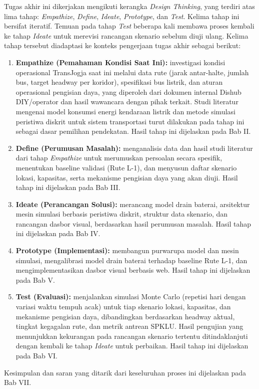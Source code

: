 Tugas akhir ini dikerjakan mengikuti kerangka \textit{Design Thinking}, yang
terdiri atas lima tahap: \textit{Empathize}, \textit{Define}, \textit{Ideate},
\textit{Prototype}, dan \textit{Test}. Kelima tahap ini bersifat iteratif.
Temuan pada tahap \textit{Test} beberapa kali membawa proses kembali ke tahap
\textit{Ideate} untuk merevisi rancangan skenario sebelum diuji ulang. Kelima
tahap tersebut diadaptasi ke konteks pengerjaan tugas akhir sebagai berikut:
\begin{enumerate}
	\item \textbf{Empathize (Pemahaman Kondisi Saat Ini):} investigasi kondisi
	operasional TransJogja saat ini melalui data rute (jarak antar-halte,
	jumlah bus, target headway per koridor), spesifikasi bus listrik, dan
	aturan operasional pengisian daya, yang diperoleh dari dokumen internal
	Dishub DIY/operator dan hasil wawancara dengan pihak terkait. Studi
	literatur mengenai model konsumsi energi kendaraan listrik dan metode
	simulasi peristiwa diskrit untuk sistem transportasi turut dilakukan pada
	tahap ini sebagai dasar pemilihan pendekatan. Hasil tahap ini dijelaskan
	pada Bab II.
	\item \textbf{Define (Perumusan Masalah):} menganalisis data dan hasil studi
	literatur dari tahap \textit{Empathize} untuk merumuskan persoalan secara
	spesifik, menentukan baseline validasi (Rute L-1), dan menyusun daftar
	skenario lokasi, kapasitas, serta mekanisme pengisian daya yang akan diuji.
	Hasil tahap ini dijelaskan pada Bab III.
	\item \textbf{Ideate (Perancangan Solusi):} merancang model drain baterai,
	arsitektur mesin simulasi berbasis peristiwa diskrit, struktur data
	skenario, dan rancangan dasbor visual, berdasarkan hasil perumusan masalah.
	Hasil tahap ini dijelaskan pada Bab IV.
	\item \textbf{Prototype (Implementasi):} membangun purwarupa model dan mesin
	simulasi, mengalibrasi model drain baterai terhadap baseline Rute L-1, dan
	mengimplementasikan dasbor visual berbasis web. Hasil tahap ini dijelaskan
	pada Bab V.
	\item \textbf{Test (Evaluasi):} menjalankan simulasi Monte Carlo (repetisi
	hari dengan variasi waktu tempuh acak) untuk tiap skenario lokasi,
	kapasitas, dan mekanisme pengisian daya, dibandingkan berdasarkan headway
	aktual, tingkat kegagalan rute, dan metrik antrean SPKLU. Hasil pengujian
	yang menunjukkan kekurangan pada rancangan skenario tertentu ditindaklanjuti
	dengan kembali ke tahap \textit{Ideate} untuk perbaikan. Hasil tahap ini
	dijelaskan pada Bab VI.
\end{enumerate}
Kesimpulan dan saran yang ditarik dari keseluruhan proses ini dijelaskan pada
Bab VII.

